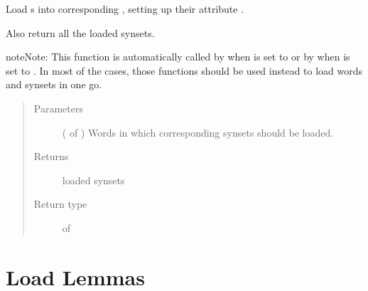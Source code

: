 \documentclass[letterpaper,10pt,english]{sphinxmanual}
\begin{document}

\begin{fulllineitems}
\label{\detokenize{index:loacore.load.synset_load.load_synsets_in_words}}
Load  s into corresponding , setting up their attribute .

Also return all the loaded synsets.

\begin{sphinxadmonition}{note}{Note:}
This function is automatically called by  when  is set to
 or by  when  is set to .
In most of the cases, those functions should be used instead to load words and synsets in one go.
\end{sphinxadmonition}
\begin{quote}\begin{description}
\item[{Parameters}] \leavevmode
{} ( of ) \textendash{} Words in which corresponding synsets should be loaded.

\item[{Returns}] \leavevmode
loaded synsets

\item[{Return type}] \leavevmode
{} of 

\end{description}\end{quote}

\end{fulllineitems}



\section{Load Lemmas}
\label{\detokenize{index:module-loacore.load.lemma_load}}\label{\detokenize{index:load-lemmas}}
\end{document}
